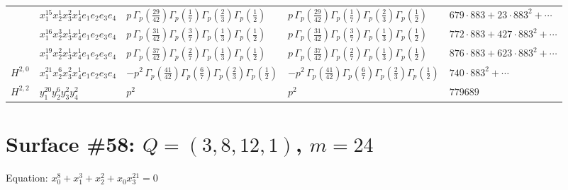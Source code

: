 \documentclass[11pt]{article}
\begin{document}
\begin{table}[ht]
{\begin{tabular}{@{}lllll@{}}
 & $x_{1}^{15} x_{2}^{1} x_{3}^{2} x_{4}^{1}  e_{1} e_{2} e_{3} e_{4}$ & $p \, \Gamma_p \left( \frac{29}{42} \right) \Gamma_p \left( \frac{1}{7} \right) \Gamma_p \left( \frac{2}{3} \right) \Gamma_p \left( \frac{1}{2} \right)$ & $p \, \Gamma_p \left( \frac{29}{42} \right) \Gamma_p \left( \frac{1}{7} \right) \Gamma_p \left( \frac{2}{3} \right) \Gamma_p \left( \frac{1}{2} \right)$ & $679{\cdot}883{+}23{\cdot}883^{2}{+}\cdots$ \\
 & $x_{1}^{16} x_{2}^{3} x_{3}^{1} x_{4}^{1}  e_{1} e_{2} e_{3} e_{4}$ & $p \, \Gamma_p \left( \frac{31}{42} \right) \Gamma_p \left( \frac{3}{7} \right) \Gamma_p \left( \frac{1}{3} \right) \Gamma_p \left( \frac{1}{2} \right)$ & $p \, \Gamma_p \left( \frac{31}{42} \right) \Gamma_p \left( \frac{3}{7} \right) \Gamma_p \left( \frac{1}{3} \right) \Gamma_p \left( \frac{1}{2} \right)$ & $772{\cdot}883{+}427{\cdot}883^{2}{+}\cdots$ \\
 & $x_{1}^{19} x_{2}^{2} x_{3}^{1} x_{4}^{1}  e_{1} e_{2} e_{3} e_{4}$ & $p \, \Gamma_p \left( \frac{37}{42} \right) \Gamma_p \left( \frac{2}{7} \right) \Gamma_p \left( \frac{1}{3} \right) \Gamma_p \left( \frac{1}{2} \right)$ & $p \, \Gamma_p \left( \frac{37}{42} \right) \Gamma_p \left( \frac{2}{7} \right) \Gamma_p \left( \frac{1}{3} \right) \Gamma_p \left( \frac{1}{2} \right)$ & $876{\cdot}883{+}623{\cdot}883^{2}{+}\cdots$ \\
\midrule
$H^{2,0}$ & $x_{1}^{21} x_{2}^{6} x_{3}^{2} x_{4}^{1}  e_{1} e_{2} e_{3} e_{4}$ & $- p^{2} \, \Gamma_p \left( \frac{41}{42} \right) \Gamma_p \left( \frac{6}{7} \right) \Gamma_p \left( \frac{2}{3} \right) \Gamma_p \left( \frac{1}{2} \right)$ & $- p^{2} \, \Gamma_p \left( \frac{41}{42} \right) \Gamma_p \left( \frac{6}{7} \right) \Gamma_p \left( \frac{2}{3} \right) \Gamma_p \left( \frac{1}{2} \right)$ & $740{\cdot}883^{2}{+}\cdots$ \\
\midrule
$H^{2,2}$ & $y_{1}^{20} y_{2}^{6} y_{3}^{2} y_{4}^{2}$ & $p^{2} \,$ & $p^{2} \,$ & $779689$ \\
\bottomrule
\end{tabular}
}
\renewcommand{\arraystretch}{1.0}
\end{table}

\newpage

\section*{Surface \#58: $Q=(3, 8, 12, 1)$, $m=24$}

Equation: $x_0^{8} + x_1^{3} + x_2^{2} + x_0 x_3^{21} = 0$
\end{document}
